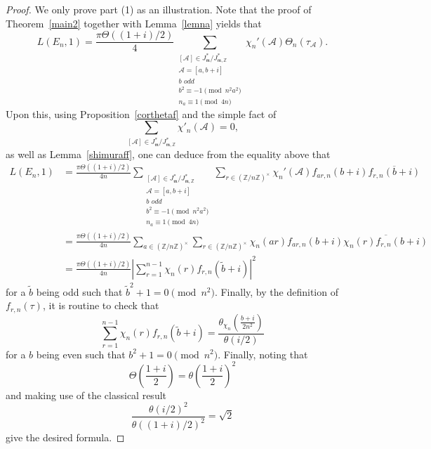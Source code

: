 \documentclass[11pt, reqno]{amsart}
\theoremstyle{plain}
\theoremstyle{definition}
\numberwithin{equation}{section}
\begin{document}
\begin{proof}
    
We only prove part (1) as an illustration.  Note that the proof of Theorem~\ref{main2} together with Lemma~\ref{lemna} yields that
     $$
   L(E_{n},1)=\frac{\pi\Theta((1+i)/2)}{4}\sum_{\substack{[\mathcal{A}]\in J_{\mathfrak{m}}^{*}/J_{\mathfrak{m},\mathbb{Z}}^{*}\\ \mathcal{A}=[a,b+i]\\b\,\,odd\\b^{2}\equiv-1\pmod{n^{2}a^{2}}\\n_{a}\equiv1\pmod{4n}}}\chi_{n}'(\mathcal{A})\Theta_{n}(\tau_{\mathcal{A}}).
    $$
Upon this,    using Proposition~\ref{corthetaf} and the simple fact of
$$
\sum_{[\mathcal{A}]\in J_{\mathfrak{m}}^{*}/J_{\mathfrak{m},\mathbb{Z}}^{*}}\chi'_{n}(\mathcal{A})=0,
$$
as well as Lemma~\ref{shimuraff},  one can deduce from the equality above that
   \begin{align*}
        L(E_{n},1)&=\frac{\pi\Theta((1+i)/2)}{4n}\sum_{\substack{[\mathcal{A}]\in J_{\mathfrak{m}}^{*}/J_{\mathfrak{m},\mathbb{Z}}^{*}\\ \mathcal{A}=[a,b+i]\\b\,\,odd\\b^{2}\equiv-1\pmod{n^{2}a^{2}}\\n_{a}\equiv1\pmod{4n}}}\sum_{r\in(\mathbb{Z}/n\mathbb{Z})^{\times}}\chi_{n}'(\mathcal{A})f_{ar,n}(b+i)\overline{f_{r,n}(b+i)}\\
         &=\frac{\pi\Theta((1+i)/2)}{4n}\sum_{a\in(\mathbb{Z}/n\mathbb{Z})^{\times}}\sum_{r\in(\mathbb{Z}/n\mathbb{Z})^{\times}}\chi_{n}(ar)f_{ar,n}(b+i)\overline{\chi_{n}(r)f_{r,n}(b+i)}\\
         &=\frac{\pi\Theta((1+i)/2)}{4n}\left|\sum_{r=1}^{n-1}\chi_{n}(r)f_{r,n}(\tilde{b}+i)\right|^{2}
    \end{align*}
    for a $\tilde{b}$ being odd such that $\tilde{b}^{2}+1=0\pmod{n^{2}}$. Finally, by the definition of $f_{r,n}(\tau)$, it is routine to check that
    $$
    \sum_{r=1}^{n-1}\chi_{n}(r)f_{r,n}(\tilde{b}+i)=\frac{\theta_{\chi_{n}}\left(\frac{b+i}{2n^{2}}\right)}{\theta(i/2)}
    $$
    for a $b$ being even such that $b^{2}+1=0\pmod{n^{2}}$. Finally, noting that
    $$
    \Theta\left(\frac{1+i}{2}\right)=\theta\left(\frac{1+i}{2}\right)^{2}
    $$
    and making use of the classical result
    $$
    \frac{\theta(i/2)^{2}}{\theta((1+i)/2)^{2}}=\sqrt{2}
    $$
    give the desired formula.

\end{proof}
\end{document}
